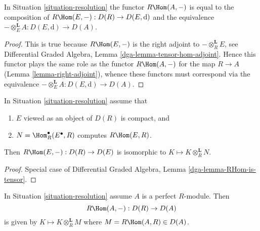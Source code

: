 \begin{lemma}
\label{lemma-RHom-dga}
In Situation \ref{situation-resolution} the functor $R\Hom(A, -)$
is equal to the composition of
$R\Hom(E, -) : D(R) \to D(E, \text{d})$
and the equivalence $- \otimes^\mathbf{L}_E A : D(E, \text{d}) \to D(A)$.
\end{lemma}

\begin{proof}
This is true because $R\Hom(E, -)$ is the right adjoint
to $- \otimes^\mathbf{L}_R E$, see
Differential Graded Algebra, Lemma \ref{dga-lemma-tensor-hom-adjoint}.
Hence this functor plays the same role as the functor
$R\Hom(A, -)$ for the map $R \to A$ (Lemma \ref{lemma-right-adjoint}),
whence these functors must correspond via the equivalence
$- \otimes^\mathbf{L}_E A : D(E, \text{d}) \to D(A)$.
\end{proof}

\begin{lemma}
\label{lemma-RHom-is-tensor}
In Situation \ref{situation-resolution} assume that
\begin{enumerate}
\item $E$ viewed as an object of $D(R)$ is compact, and
\item $N = \Hom^\bullet_R(E^\bullet, R)$ computes $R\Hom(E, R)$.
\end{enumerate}
Then $R\Hom(E, -) : D(R) \to D(E)$ is isomorphic to
$K \mapsto K \otimes_R^\mathbf{L} N$.
\end{lemma}

\begin{proof}
Special case of Differential Graded Algebra, Lemma
\ref{dga-lemma-RHom-is-tensor}.
\end{proof}

\begin{lemma}
\label{lemma-RHom-is-tensor-special}
In Situation \ref{situation-resolution} assume $A$ is a perfect $R$-module.
Then
$$
R\Hom(A, -) : D(R) \to D(A)
$$
is given by $K \mapsto K \otimes_R^\mathbf{L} M$
where $M = R\Hom(A, R) \in D(A)$.
\end{lemma}

